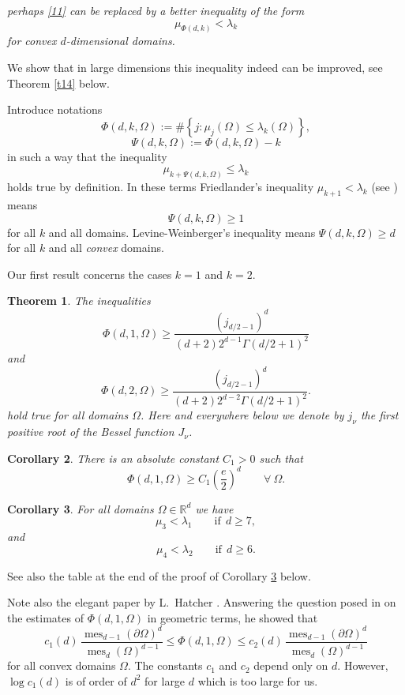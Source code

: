 \documentclass[a4paper,12pt]{article}
\numberwithin{equation}{section}
\def \la{\lambda}
\def \G{\Gamma}
\def \O{\Omega}
\def \R{\mathbb{R}}
\def\dd{\partial}
\def\mes{\operatorname{mes}}
\newcommand{\<}{\langle}
\renewcommand{\>}{\rangle}
\theoremstyle{plain}
\newtheorem{theorem}{\bf Theorem}[section]
\newtheorem{cor}[theorem]{\bf Corollary}
\theoremstyle{definition}
\theoremstyle{remark}
\renewcommand{\le}{\leqslant}
\renewcommand{\ge}{\geqslant}
\begin{document}
{\it perhaps \eqref{11} can be replaced by a better inequality of the form
$$
\mu_{\Phi(d,k)} < \la_k
$$
for convex $d$-dimensional domains.}

We show that in large dimensions this inequality indeed can be improved,
see Theorem \ref{t14} below.

Introduce notations
$$
\Phi (d, k, \O) := \# \left\{ j : \mu_j (\O) \le \la_k (\O)\right\},
$$
$$
\Psi (d, k, \O) := \Phi (d, k, \O) - k
$$
in such a way that the inequality
$$
\mu_{k + \Psi(d,k,\O)} \le \la_k
$$
holds true by definition.
In these terms Friedlander's inequality 
$\mu_{k+1} < \la_k$ (see \cite{Fr91, F04}) means 
\begin{equation}
\label{*}
\Psi (d,k,\O) \ge 1
\end{equation}
for all $k$ and all domains.
Levine-Weinberger's inequality means $\Psi (d,k,\O) \ge d$ 
for all $k$ and all {\it convex} domains.

Our first result concerns the cases $k=1$ and $k=2$.

\begin{theorem}
\label{t11}
The inequalities
\begin{equation}
\label{12}
\Phi (d,1,\O) \ge \frac{(j_{d/2-1})^d}{(d+2) 2^{d-1} \G(d/2+1)^2}
\end{equation}
and
\begin{equation*}
\Phi (d,2,\O) \ge \frac{(j_{d/2-1})^d}{(d+2) 2^{d-2} \G(d/2+1)^2}.
\end{equation*}
hold true for all domains $\O$.
Here and everywhere below we denote by $j_\nu$ the first positive root
of the Bessel function $J_\nu$. 
\end{theorem}

\begin{cor}
\label{c12}
There is an absolute constant $C_1 > 0$ such that
\begin{equation}
\label{13} 
\Phi (d,1,\O) \ge C_1 \left(\frac{e}2\right)^d \qquad \forall \ \O.
\end{equation}
\end{cor}

\begin{cor}
\label{c13}
For all domains $\O \in \R^d$ we have
$$
\mu_3 < \la_1 \qquad \text{if} \ \ d \ge 7,
$$
and
$$
\mu_4 < \la_2 \qquad \text{if} \ \ d \ge 6.
$$
\end{cor}

See also the table at the end of the proof of Corollary \ref{c13} below.

Note also the elegant paper by L.~Hatcher \cite{Hatcher}.
Answering the question posed in \cite{CMS} on the estimates of $\Phi(d,1,\O)$
in geometric terms, he showed that
$$
c_1(d) \,\frac{\mes_{d-1}(\dd\O)^d}{\mes_d (\O)^{d-1}}
\le \Phi(d,1,\O) \le 
c_2(d) \,\frac{\mes_{d-1}(\dd\O)^d}{\mes_d (\O)^{d-1}}
$$
for all convex domains $\O$.
The constants $c_1$ and $c_2$ depend only on $d$.
However, $\log c_1 (d)$ is of order of $d^2$ for large $d$
which is too large for us.
\end{document}
